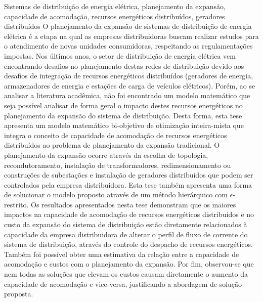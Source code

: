 \documentclass[tesedr]{eesc}
\begin{document}


\begin{resumo}{Sistemas de distribuição de energia elétrica, planejamento da expans\~ao, capacidade de acomodação, recursos energéticos distribuídos, geradores distribuídos}
\noindent O planejamento da expansão de sistemas de distribuição de energia elétrica é a etapa na qual as empresas distribuidoras buscam realizar estudos para o atendimento de novas unidades consumidoras, respeitando as regulamentações impostas. Nos últimos anos, o setor de distribuição de energia elétrica vem encontrando desafios no planejamento destas redes de distribuição devido aos desafios de integração de recursos energéticos distribuídos (geradores de energia, armazenadores de energia e estações de carga de veículos elétricos). Porém, ao se analisar a literatura acadêmica, não foi encontrado um modelo matemático que seja possível analisar de forma geral o impacto destes recursos energéticos no planejamento da expansão do sistema de distribuição. Desta forma, esta tese apresenta
um modelo matemático bi-objetivo de otimização inteira-mista que integra o conceito de capacidade de acomodação de recursos energéticos distribuídos ao problema de planejamento da expansão tradicional. O planejamento da expansão ocorre através da escolha de topologia, recondutoramento, instalação de transformadores, redimensionamento ou construções de subestações e instalação de geradores distribuídos que podem ser controlados pela empresa distribuidora. Esta tese também apresenta uma forma de solucionar o modelo proposto através de um método hierárquico com $\epsilon$-restrito.
Os resultados apresentados nesta tese demonstram que os maiores impactos na capacidade de acomodação de recursos energéticos distribuídos e no custo da expansão do sistema de distribuição estão diretamente relacionados à capacidade da empresa distribuidora de alterar o perfil de fluxo de corrente do sistema de distribuição, através do controle do despacho de recursos energéticos. Também foi possível obter uma estimativa da relação entre a capacidade de acomodação e custos com o planejamento da expansão. Por fim, observou-se que nem todas as soluções que elevam os custos causam diretamente o aumento da capacidade de acomodação e vice-versa, justificando a abordagem de solução proposta.
\end{resumo}
\end{document}
